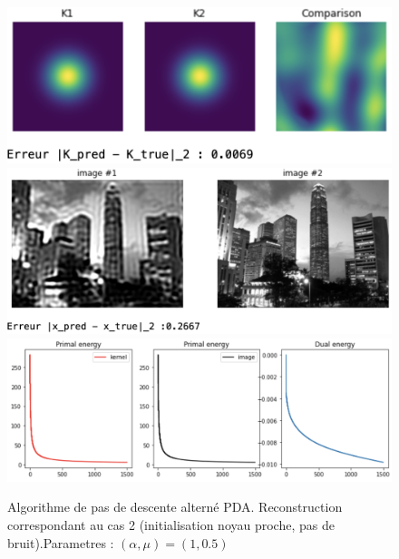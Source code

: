 \documentclass[a4paper]{article}
\begin{document}
\begin{figure}[h]
\includegraphics[scale=0.8]{figures/algov-cas2-kernel}
\includegraphics[scale=0.6]{figures/algov-cas2-image}
\includegraphics[scale=0.6]{figures/algov-cas2-energy}
\caption{Algorithme de pas de descente alterné PDA. Reconstruction correspondant au cas 2  (initialisation noyau proche, pas de bruit).Parametres : $(\alpha,\mu) =(1,0.5)$}
\end{figure}
\end{document}
